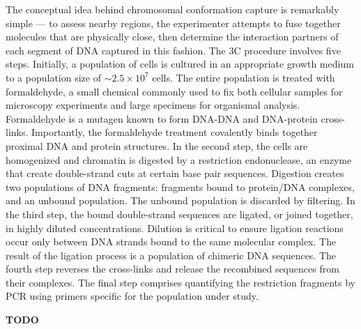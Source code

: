 The conceptual idea behind chromosomal conformation capture is remarkably
simple --- to assess nearby regions, the experimenter attempts to fuse
together molecules that are physically close, then determine the interaction
partners of each segment of DNA captured in this fashion.  The 3C procedure
involves five steps.   Initially, a population of cells is cultured in an appropriate
growth medium to a population size of $\sim2.5 \times 10^7$ cells\cite{berkum2010}.
The entire population is treated with formaldehyde, a small chemical commonly
used to fix both cellular samples for microscopy experiments and large specimens
for organismal analysis.  Formaldehyde is a mutagen known to form DNA-DNA and
DNA-protein cross-links\cite{merk1998}.  Importantly, the formaldehyde
treatment covalently binds together proximal DNA and protein structures.
In the second step, the cells are homogenized and chromatin is digested by a
restriction endonuclease, an enzyme that create double-strand cuts at certain
base pair sequences\cite{berkum2010}.  Digestion creates two populations of
DNA fragments: fragments bound to protein/DNA complexes, and an unbound
population.  The unbound population is discarded by filtering.  In the
third step, the bound double-strand sequences are ligated, or joined together,
in highly diluted concentrations. Dilution is critical to ensure ligation
reactions occur only between DNA strands bound to the same molecular complex.
The result of the ligation process is a population of chimeric DNA sequences.
The fourth step reverses the cross-links and release the recombined sequences
from their complexes.  The final step comprises quantifying the restriction
fragments by PCR using primers specific for the population under
study\cite{simonis2007}.

\textbf{TODO}
%
%


